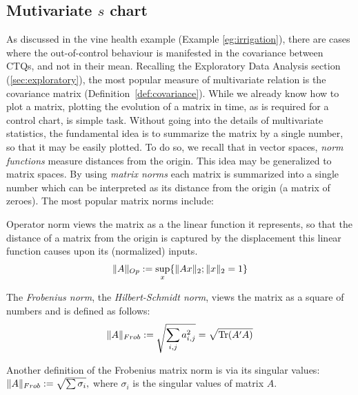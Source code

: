 \subsection{Mutivariate $s$ chart}
\label{sec:multivarite_s}

As discussed in the vine health example (Example \ref{eg:irrigation}), there are cases where the out-of-control behaviour is manifested in the covariance between CTQs, and not in their mean.
Recalling the Exploratory Data Analysis section (\ref{sec:exploratory}), the most popular measure of multivariate relation is the covariance matrix (Definition~\ref{def:covariance}).
While we already know how to plot a matrix, plotting the evolution of a matrix in time, as is required for a control chart, is simple task. 
Without going into the details of multivariate statistics, the fundamental idea is to summarize the matrix by a single number, so that it may be easily plotted. 
To do so, we recall that in vector spaces, \emph{norm functions} measure distances from the origin.
This idea may be generalized to matrix spaces. By using \emph{matrix norms} each matrix is summarized into a single number which can be interpreted as its distance from the origin (a matrix of zeroes).
The most popular matrix norms include:

\begin{definition}
Operator norm views the matrix as a the linear function it represents, so that the distance of a matrix from the origin is captured by the displacement this linear function causes upon its (normalized) inputs.
\begin{align}
	\Vert A \Vert_{Op}:= \sup_x \{ \Vert Ax \Vert_2; \Vert x \Vert_2=1 \}
\end{align}
\end{definition}


\begin{definition}
The \emph{Frobenius norm}, \aka the \emph{Hilbert-Schmidt norm}, views the matrix as a square of numbers and is defined as follows:
\begin{align}
	\Vert A \Vert_{Frob}:= \sqrt{\sum_{i,j} a_{i,j}^2} = \sqrt{\operatorname{Tr}(A'A)}
\end{align}
\end{definition}

\begin{extra}
Another definition of the Frobenius matrix norm is via its singular values:
$ 	\Vert A \Vert_{Frob}:= \sqrt{\sum \sigma_i}, $
where $\sigma_i$ is the singular values of matrix $A$.
\end{extra}


